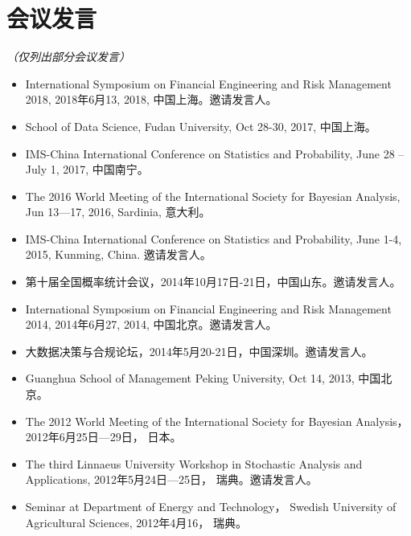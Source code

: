 \documentclass[twoside,a4paper,10pt]{amsart}
\begin{document}
\section*{会议发言}

\emph{（仅列出部分会议发言）}

\begin{itemize}

\item International Symposium on Financial Engineering and Risk Management 2018, 2018年6月13,
  2018, 中国上海。邀请发言人。


\item School of Data Science, Fudan University, Oct 28-30, 2017, 中国上海。

\item IMS-China International Conference on Statistics and Probability, June 28 – July 1,
  2017, 中国南宁。


\item The 2016 World Meeting of the International Society for Bayesian Analysis, Jun
  13—17, 2016, Sardinia, 意大利。

\item IMS-China International Conference on Statistics and Probability, June 1-4, 2015,
  Kunming, China. 邀请发言人。

\item 第十届全国概率统计会议，2014年10月17日-21日，中国山东。邀请发言人。

\item International Symposium on Financial Engineering and Risk Management 2014, 2014年6月27,
  2014, 中国北京。邀请发言人。

\item 大数据决策与合规论坛，2014年5月20-21日，中国深圳。邀请发言人。

\item Guanghua School of Management Peking University, Oct 14, 2013, 中国北京。

\item The 2012 World Meeting of the International Society for Bayesian
  Analysis， 2012年6月25日---29日， 日本。

\item The third Linnaeus University Workshop in Stochastic Analysis and
  Applications, 2012年5月24日---25日， 瑞典。邀请发言人。

\item Seminar at Department of Energy and Technology， Swedish
  University of Agricultural Sciences, 2012年4月16， 瑞典。


\end{itemize}
\end{document}

